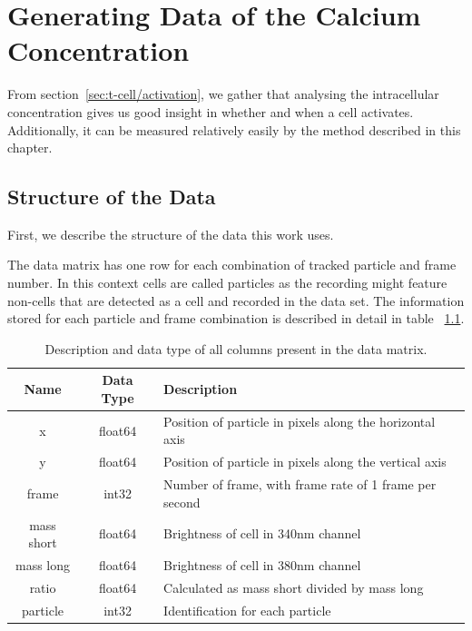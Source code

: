 \chapter{Generating Data of the Calcium Concentration}
\label{chapter:data}

From section~\ref{sec:t-cell/activation}, we gather that analysing the intracellular \Calcium concentration gives us good insight in whether and when a cell activates. Additionally, it can be measured relatively easily by the method described in this chapter.

\section{Structure of the Data}
\label{sec:structure_of_data}

First, we describe the structure of the data this work uses. 

The data matrix has one row for each combination of tracked particle and frame number. In this context cells are called particles as the recording might feature non-cells that are detected as a cell and recorded in the data set. The information stored for each particle and frame combination is described in detail in table ~\ref{tab:information_data_matrix}.

\begin{table}[h!]
	\centering
	\begin{tabular}{|c|c|l|}
		\hline
		\textbf{Name} & \textbf{Data Type} & \textbf{Description} \\
		\hline
		x & float64 & Position of particle in pixels along the horizontal axis \\
		\hline
		y & float64 & Position of particle in pixels along the vertical axis \\
		\hline
		frame & int32 & Number of frame, with frame rate of 1 frame per second \\
		\hline
		mass short & float64 & Brightness of cell in 340nm channel \\
		\hline
		mass long & float64 & Brightness of cell in 380nm channel \\
		\hline
		ratio & float64 & Calculated as mass short divided by mass long \\
		\hline
		particle & int32 & Identification for each particle \\
		\hline
	\end{tabular}
	\caption{Description and data type of all columns present in the data matrix.}
	\label{tab:information_data_matrix}
\end{table}

